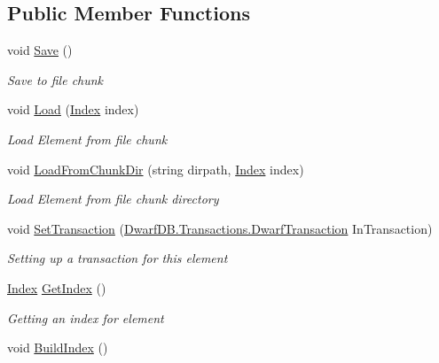 \subsection*{Public Member Functions}
\begin{DoxyCompactItemize}
\item 
void \hyperlink{interface_dwarf_d_b_1_1_data_structures_1_1_i_structure_aa97bbd5250cf7456849fa6ca6ffcc0b4}{Save} ()
\begin{DoxyCompactList}\small\item\em Save to file chunk \end{DoxyCompactList}\item 
void \hyperlink{interface_dwarf_d_b_1_1_data_structures_1_1_i_structure_acc1c091913384168ec50edad8b94b94b}{Load} (\hyperlink{class_dwarf_d_b_1_1_data_structures_1_1_index}{Index} index)
\begin{DoxyCompactList}\small\item\em Load Element from file chunk \end{DoxyCompactList}\item 
void \hyperlink{interface_dwarf_d_b_1_1_data_structures_1_1_i_structure_a2e187a88a03b9e81e6e602be9329a395}{Load\+From\+Chunk\+Dir} (string dirpath, \hyperlink{class_dwarf_d_b_1_1_data_structures_1_1_index}{Index} index)
\begin{DoxyCompactList}\small\item\em Load Element from file chunk directory \end{DoxyCompactList}\item 
void \hyperlink{interface_dwarf_d_b_1_1_data_structures_1_1_i_structure_aa89d0ecc5915538b89865bc3086d8b0a}{Set\+Transaction} (\hyperlink{class_dwarf_d_b_1_1_transactions_1_1_dwarf_transaction}{Dwarf\+D\+B.\+Transactions.\+Dwarf\+Transaction} In\+Transaction)
\begin{DoxyCompactList}\small\item\em Setting up a transaction for this element \end{DoxyCompactList}\item 
\hyperlink{class_dwarf_d_b_1_1_data_structures_1_1_index}{Index} \hyperlink{interface_dwarf_d_b_1_1_data_structures_1_1_i_structure_a6fb14f0bf9df3268084bcc31dfd9c56f}{Get\+Index} ()
\begin{DoxyCompactList}\small\item\em Getting an index for element \end{DoxyCompactList}\item 
void \hyperlink{interface_dwarf_d_b_1_1_data_structures_1_1_i_structure_ae172c3eadf80027006666105c16b11ab}{Build\+Index} ()

\end{DoxyCompactItemize}
